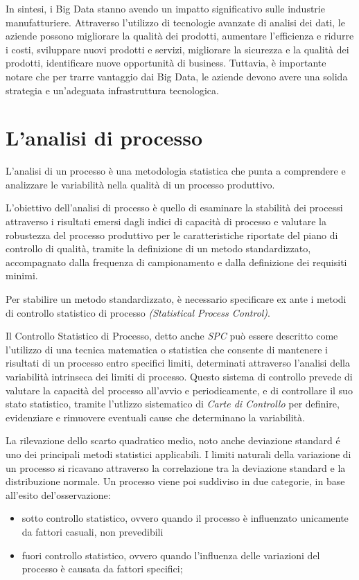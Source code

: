 In sintesi, i Big Data stanno avendo un impatto significativo sulle industrie manufatturiere. Attraverso l'utilizzo di tecnologie avanzate di analisi dei dati, le aziende possono migliorare la qualità dei prodotti, aumentare l'efficienza e ridurre i costi, sviluppare nuovi prodotti e servizi, migliorare la sicurezza e la qualità dei prodotti, identificare nuove opportunità di business. Tuttavia, è importante notare che per trarre vantaggio dai Big Data, le aziende devono avere una solida strategia e un'adeguata infrastruttura tecnologica. 
\cite{o2015big}

\clearpage
\section{L'analisi di processo}
L'analisi di un processo è una metodologia statistica che punta a comprendere e analizzare le variabilità nella qualità di un processo produttivo. 
\cite{qualityi}


L'obiettivo dell'analisi di processo è quello di esaminare la stabilità dei processi attraverso i risultati emersi dagli indici di capacità di processo e valutare la robustezza del processo produttivo per le caratteristiche riportate del piano di controllo di qualità, tramite la definizione di un metodo standardizzato, accompagnato dalla frequenza di campionamento e dalla definizione dei requisiti minimi. 
\cite{blogkainexus}


Per stabilire un metodo standardizzato, è necessario specificare ex ante i metodi di controllo statistico di processo \textit{(Statistical Process Control)}.


Il Controllo Statistico di Processo, detto anche \textit{SPC} può essere descritto come l'utilizzo di una tecnica matematica o statistica che consente di mantenere i risultati di un processo entro specifici limiti, determinati attraverso l'analisi della variabilità intrinseca dei limiti di processo.
Questo sistema di controllo prevede di valutare la capacità del processo all'avvio e periodicamente, e di controllare il suo stato statistico, tramite l'utlizzo sistematico di \textit{Carte di Controllo} per definire, evidenziare e rimuovere eventuali cause che determinano la variabilità.
\cite{WikipediaSPC}


La rilevazione dello scarto quadratico medio, noto anche deviazione standard é uno dei principali metodi statistici applicabili. 
I limiti naturali della variazione di un processo si ricavano attraverso la correlazione tra la deviazione standard e la distribuzione normale.
Un processo viene poi suddiviso in due categorie, in base all'esito del'osservazione:
\begin{itemize}
\item sotto controllo statistico, ovvero quando il processo è influenzato unicamente da fattori casuali, non prevedibili
\item fuori controllo statistico, ovvero quando l'influenza delle variazioni del processo è causata da fattori specifici;
\end{itemize}

